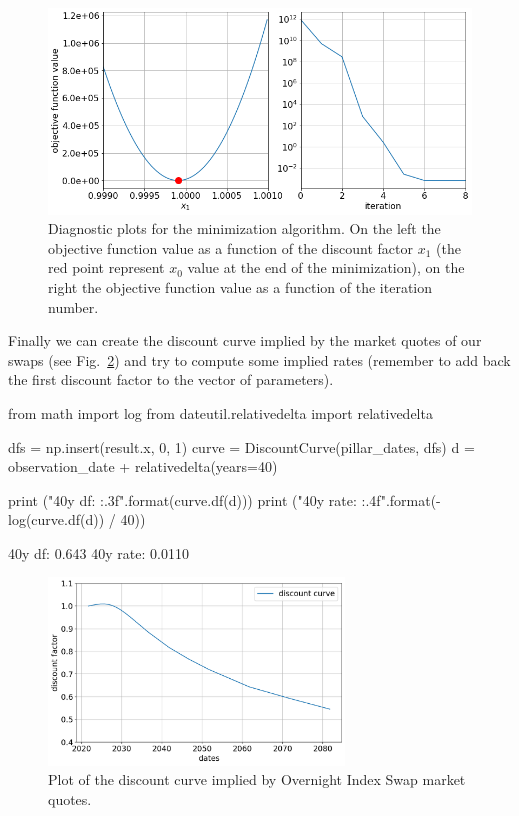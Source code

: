 \begin{figure}[htb]
	\centering
	\includegraphics[width=0.9\linewidth]{figures/obj_func_diagnostic}
	\caption{Diagnostic plots for the minimization algorithm. On the left the objective function value as a function of the discount factor $x_1$ (the red point represent $x_0$ value at the end of the minimization), on the right the objective function value as a function of the iteration number.}
	\label{fig:minimization_diagnostic}
\end{figure}

Finally we can create the discount curve implied by the market quotes of our swaps (see Fig.~\ref{fig:discount_curve}) and try to compute some implied rates (remember to add back the first discount factor to the vector of parameters).

\begin{ipython}
from math import log
from dateutil.relativedelta import relativedelta

dfs = np.insert(result.x, 0, 1)
curve = DiscountCurve(pillar_dates, dfs)
d = observation_date + relativedelta(years=40)

print ("40y df: {:.3f}".format(curve.df(d)))
print ("40y rate: {:.4f}".format(-log(curve.df(d)) / 40))
\end{ipython}
\begin{ioutput}
40y df: 0.643
40y rate: 0.0110
\end{ioutput}

\begin{figure}[htb]
	\centering
	\includegraphics[width=0.7\textwidth]{figures/example_discount_curve}
	\caption{Plot of the discount curve implied by Overnight Index Swap market quotes.}
	\label{fig:discount_curve}
\end{figure}

